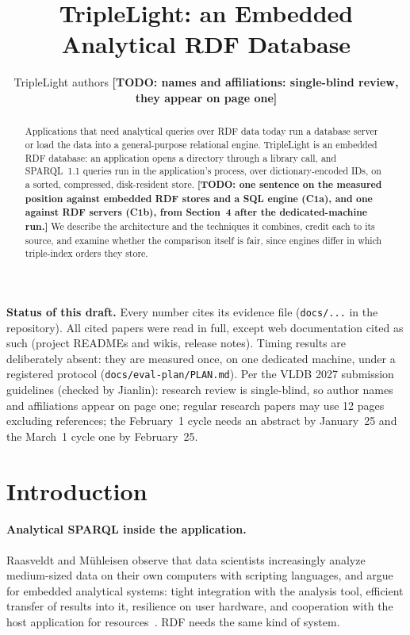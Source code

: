 \documentclass[sigconf, nonacm]{acmart}
\newcommand{\todo}[1]{\textbf{[TODO: #1]}}
\begin{document}
\title{TripleLight: an Embedded Analytical RDF Database}
\author{TripleLight authors \todo{names and affiliations: single-blind review, they appear on page one}}

\begin{abstract}
Applications that need analytical queries over RDF data today run a database server or load the data into a general-purpose
relational engine. TripleLight is an embedded RDF database: an application opens a directory through a library call, and
SPARQL~1.1 queries run in the application's process, over dictionary-encoded IDs, on a sorted, compressed, disk-resident store.
\todo{one sentence on the measured position against embedded RDF stores and a SQL engine (C1a), and one against RDF servers (C1b), from Section~4 after the dedicated-machine run.}
We describe the architecture and the techniques it combines, credit each to its source, and examine whether the comparison itself is fair, since
engines differ in which triple-index orders they store.
\end{abstract}

\maketitle

\vldbtopmatter

\begingroup\small
\noindent\textbf{Status of this draft.} Every number cites its evidence file (\texttt{docs/...} in the repository).
All cited papers were read in full, except web documentation cited as such (project READMEs and wikis, release notes). Timing results are deliberately absent: they are measured once, on one dedicated machine, under a registered protocol (\texttt{docs/eval-plan/PLAN.md}).
Per the VLDB 2027 submission guidelines (checked by Jianlin): research review is single-blind, so author names and affiliations appear on page one; regular research papers may use 12 pages excluding references; the February~1 cycle needs an abstract by January~25 and the March~1 cycle one by February~25.

\endgroup


\section{Introduction}
\paragraph{Analytical SPARQL inside the application.} Raasveldt and M\"uhleisen observe that data scientists increasingly analyze medium-sized data on their own computers with scripting languages, and argue for embedded analytical systems: tight integration with the analysis tool, efficient transfer of results into it, resilience on user hardware, and cooperation with the host application for resources~\cite{raasveldt2020}. RDF needs the same kind of system.
\end{document}
